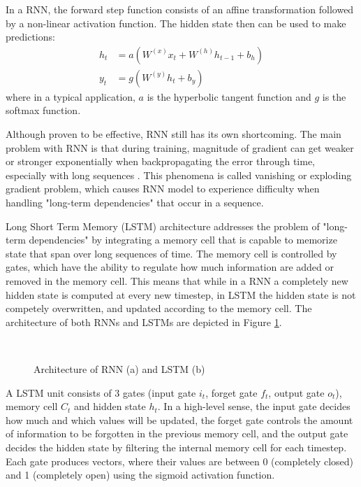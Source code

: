 \documentclass[12pt]{extarticle}
\begin{document}
In a RNN, the forward step function consists of an affine transformation followed by a non-linear activation function. The hidden state then can be used to make predictions:
\begin{align}
h_{t} &= a(W^{(x)}x_{t} + W^{(h)}h_{t-1} + b_{h})\\
y_{t} &= g(W^{(y)}h_{t} + b_{y}) 
\end{align}
where in a typical application, $a$ is the hyperbolic tangent function and $g$ is the softmax function.

Although proven to be effective, RNN still has its own shortcoming. The main problem with RNN is that during training, magnitude of gradient can get weaker or stronger exponentially when backpropagating the error through time, especially with long sequences \citep{Hochreiter:1998:VGP:353515.355233, 279181}. This phenomena is called vanishing or exploding gradient problem, which causes RNN model to experience difficulty when handling "long-term dependencies" that occur in a sequence.

Long Short Term Memory (LSTM) architecture \citep{Hochreiter:1997:LSM:1246443.1246450} addresses the problem of "long-term dependencies" by integrating a memory cell that is capable to memorize state that span over long sequences of time. The memory cell is controlled by gates, which have the ability to regulate how much information are added or removed in the memory cell. This means that while in a RNN a completely new hidden state is computed at every new timestep, in LSTM the hidden state is not competely overwritten, and updated according to the memory cell. The architecture of both RNNs and LSTMs are depicted in Figure \ref{fig:rnn}.
\begin{figure}[ht]
\centering
{} \\

\caption{Architecture of RNN (a) and LSTM (b)}
\label{fig:rnn}
\end{figure}

A LSTM unit consists of 3 gates (input gate $i_{t}$, forget gate $f_{t}$, output gate $o_{t}$), memory cell $C_{t}$ and hidden state $h_{t}$. In a high-level sense, the input gate decides how much and which values will be updated, the forget gate controls the amount of information to be forgotten in the previous memory cell, and the output gate decides the hidden state by filtering the internal memory cell for each timestep. Each gate produces vectors, where their values are between 0 (completely closed) and 1 (completely open) using the sigmoid activation function. 
\end{document}
